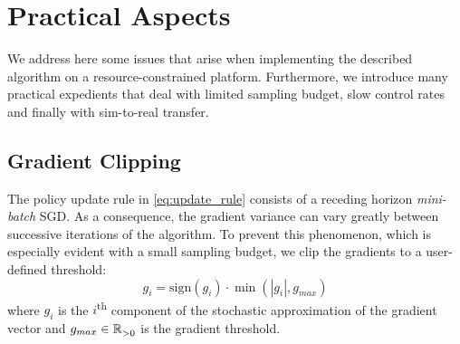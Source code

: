 \section{Practical Aspects} \label{sec:practical_aspects}

We address here some issues that arise when implementing the described algorithm on a resource-constrained platform. Furthermore, we introduce many practical expedients that deal with limited sampling budget, slow control rates and finally with sim-to-real transfer.  

\subsection{Gradient Clipping} 
The policy update rule in \eqref{eq:update_rule} consists of a receding horizon \emph{mini-batch} SGD. As a consequence, the gradient variance can vary greatly between successive iterations of the algorithm. To prevent this phenomenon, which is especially evident with a small sampling budget, we clip the gradients to a user-defined threshold:
\begin{equation}
    g_i = \text{sign}(g_i) \cdot \min(|g_i|, g_{max}) 
\end{equation}
where $g_i$ is the $i$\textsuperscript{th} component of the stochastic approximation of the gradient vector and $g_{max} \in \mathbb{R}^{}_{>0}$ is the gradient threshold.

